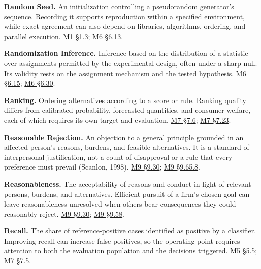 \noindent\textbf{Random Seed.} An initialization controlling a pseudorandom
generator's sequence. Recording it supports reproduction within a
specified environment, while exact agreement can also depend on
libraries, algorithms, ordering, and parallel execution.
\href{Marketing_Analytics_Lecture_Notes.pdf\#M01-python-objects-and-reproducible-calculations}{M1
§1.3};
\href{Marketing_Analytics_Lecture_Notes.pdf\#M06-mhealth-planning-a-randomized-suggestion-test}{M6
§6.13}.

\noindent\textbf{Randomization Inference.} Inference based on the distribution of
a statistic over assignments permitted by the experimental design, often
under a sharp null. Its validity rests on the assignment mechanism and
the tested hypothesis.
\href{Marketing_Analytics_Lecture_Notes.pdf\#M06-mhealth-prior-activity-and-experiment-precision}{M6
§6.15};
\href{Marketing_Analytics_Lecture_Notes.pdf\#M06-store-assignment-and-false-discoveries}{M6
§6.30}.

\noindent\textbf{Ranking.} Ordering alternatives according to a score or rule.
Ranking quality differs from calibrated probability, forecasted
quantities, and consumer welfare, each of which requires its own target
and evaluation.
\href{Marketing_Analytics_Lecture_Notes.pdf\#M07-ranking-and-calibration-answer-different-questions}{M7
§7.6};
\href{Marketing_Analytics_Lecture_Notes.pdf\#M07-the-same-ranking-can-produce-different-demand-forecasts}{M7
§7.23}.

\noindent\textbf{Reasonable Rejection.} An objection to a general principle
grounded in an affected person's reasons, burdens, and feasible
alternatives. It is a standard of interpersonal justification, not a
count of disapproval or a rule that every preference must prevail
(Scanlon, 1998).
\hyperref[M09-what-a-company-ought-to-do]{M9
§9.30};
\hyperref[M09-maxims-of-data-production-and-disclosure]{M9
§9.65.8}.

\noindent\textbf{Reasonableness.} The acceptability of reasons and conduct in
light of relevant persons, burdens, and alternatives. Efficient pursuit
of a firm's chosen goal can leave reasonableness unresolved when others
bear consequences they could reasonably reject.
\hyperref[M09-what-a-company-ought-to-do]{M9
§9.30};
\hyperref[M09-a-reasonable-principle-for-acting-under-uncertainty]{M9
§9.58}.

\noindent\textbf{Recall.} The share of reference-positive cases identified as
positive by a classifier. Improving recall can increase false positives,
so the operating point requires attention to both the evaluation
population and the decisions triggered.
\href{Marketing_Analytics_Lecture_Notes.pdf\#M05-case-study-a-complaint-detector-under-changing-prevalence}{M5
§5.5};
\href{Marketing_Analytics_Lecture_Notes.pdf\#M07-case-study-accuracy-can-conceal-a-useless-model}{M7
§7.5}.

